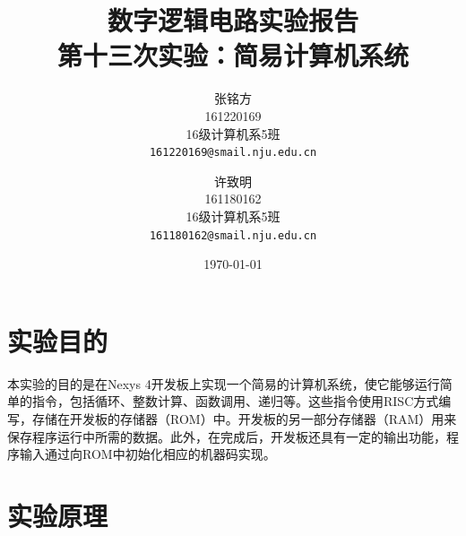 \documentclass[titlepage, 11pt]{article}
\begin{document}
	\title{\vspace{-25mm}数字逻辑电路实验报告\\\vspace{15mm}\Huge\textbf{第十三次实验：简易计算机系统}\vspace{60mm}}
	\author{张铭方\\161220169\\16级计算机系5班\\\texttt{161220169@smail.nju.edu.cn}\and 许致明\\161180162\\16级计算机系5班\\\texttt{161180162@smail.nju.edu.cn}}\date{\vspace{30mm}\today}
	\maketitle
	\tableofcontents\newpage
	\section{实验目的}
	本实验的目的是在Nexys 4开发板上实现一个简易的计算机系统，使它能够运行简单的指令，包括循环、整数计算、函数调用、递归等。这些指令使用RISC方式编写，存储在开发板的存储器（ROM）中。开发板的另一部分存储器（RAM）用来保存程序运行中所需的数据。此外，在完成后，开发板还具有一定的输出功能，程序输入通过向ROM中初始化相应的机器码实现。
	\section{实验原理}
\end{document}
